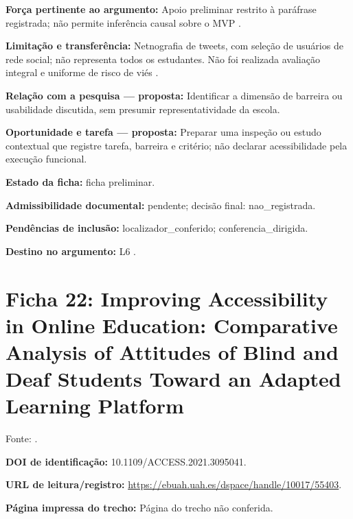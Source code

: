 \noindent\textbf{Força pertinente ao argumento:} Apoio preliminar restrito à paráfrase registrada; não permite inferência causal sobre o MVP \citep{azionya2021}.\par\medskip

\noindent\textbf{Limitação e transferência:} Netnografia de tweets, com seleção de usuários de rede social; não representa todos os estudantes. Não foi realizada avaliação integral e uniforme de risco de viés \citep{azionya2021}.\par\medskip

\noindent\textbf{Relação com a pesquisa — proposta:} Identificar a dimensão de barreira ou usabilidade discutida, sem presumir representatividade da escola.\par\medskip

\noindent\textbf{Oportunidade e tarefa — proposta:} Preparar uma inspeção ou estudo contextual que registre tarefa, barreira e critério; não declarar acessibilidade pela execução funcional.\par\medskip

\noindent\textbf{Estado da ficha:} ficha preliminar.\par\medskip

\noindent\textbf{Admissibilidade documental:} pendente; decisão final: nao\_registrada.\par\medskip

\noindent\textbf{Pendências de inclusão:} localizador\_conferido; conferencia\_dirigida.\par\medskip

\noindent\textbf{Destino no argumento:} L6 .

\clearpage\section*{Ficha 22: Improving Accessibility in Online Education: Comparative Analysis of Attitudes of Blind and Deaf Students Toward an Adapted Learning Platform}

Fonte: \citet{batanero2021}.

\noindent\textbf{DOI de identificação:} 10.1109/ACCESS.2021.3095041.\par\medskip

\noindent\textbf{URL de leitura/registro:} \url{https://ebuah.uah.es/dspace/handle/10017/55403}.\par\medskip

\noindent\textbf{Página impressa do trecho:} Página do trecho não conferida.\par\medskip

